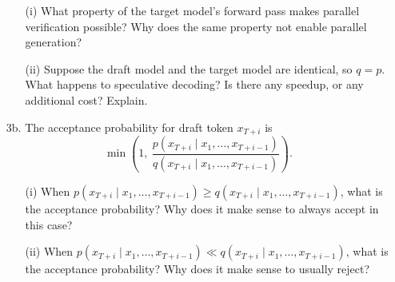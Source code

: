 \documentclass[submit]{../harvardml}
\begin{document}
\begin{framed}
\begin{enumerate}
  \begin{enumerate}
    \item[(i)] What property of the target model's forward pass makes parallel verification possible? Why does the same property not enable parallel generation?
    \item[(ii)] Suppose the draft model and the target model are identical, so $q = p$. What happens to speculative decoding? Is there any speedup, or any additional cost? Explain.
  \end{enumerate}
  
  \item[3b.] The acceptance probability for draft token $x_{T+i}$ is
  \[
  \min\!\left(1, \ \frac{p(x_{T+i} \mid x_1, \ldots, x_{T+i-1})}{q(x_{T+i} \mid x_1, \ldots, x_{T+i-1})}\right).
  \]
  
  \begin{enumerate}
    \item[(i)] When $p(x_{T+i} \mid x_1, \ldots, x_{T+i-1}) \geq q(x_{T+i} \mid x_1, \ldots, x_{T+i-1})$, what is the acceptance probability? Why does it make sense to always accept in this case?
    \item[(ii)] When $p(x_{T+i} \mid x_1, \ldots, x_{T+i-1}) \ll q(x_{T+i} \mid x_1, \ldots, x_{T+i-1})$, what is the acceptance probability? Why does it make sense to usually reject?
  \end{enumerate}
\end{enumerate}
\end{framed}

\newpage
\end{document}
